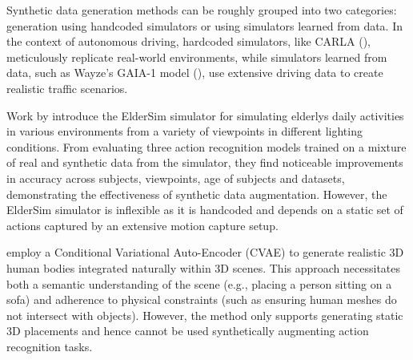 Synthetic data generation methods can be roughly grouped into two categories: generation using handcoded simulators or using simulators learned from data. In the context of autonomous driving, hardcoded simulators, like CARLA (\cite{Dosovitskiy17}), meticulously replicate real-world environments, while simulators learned from data, such as Wayze's GAIA-1 model (\cite{hu2023gaia1generativeworldmodel}), use extensive driving data to create realistic traffic scenarios. 

Work by \cite{Hwang_2020} introduce the ElderSim simulator for simulating elderlys daily activities in various environments from a variety of viewpoints in different lighting conditions. From evaluating three action recognition models trained on a mixture of real and synthetic data from the simulator, they find noticeable improvements in accuracy across subjects, viewpoints, age of subjects and datasets, demonstrating the effectiveness of synthetic data augmentation. However, the ElderSim simulator is inflexible as it is handcoded and depends on a static set of actions captured by an extensive motion capture setup. 

\cite{PSI:2019} employ a Conditional Variational Auto-Encoder (CVAE) to generate realistic 3D human bodies integrated naturally within 3D scenes. This approach necessitates both a semantic understanding of the scene (e.g., placing a person sitting on a sofa) and adherence to physical constraints (such as ensuring human meshes do not intersect with objects). However, the method only supports generating static 3D placements and hence cannot be used synthetically augmenting action recognition tasks. 






